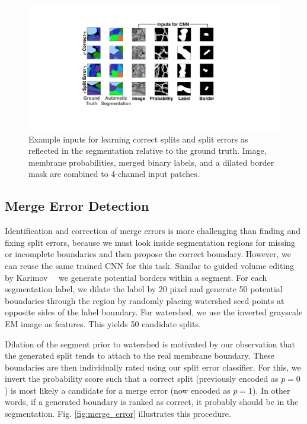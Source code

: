 \begin{figure}[h]
\begin{center}
  \includegraphics[width=\linewidth]{gfx/cnn_inputs.pdf}
\end{center}
   \caption{Example inputs for learning correct splits and split errors as reflected in the segmentation relative to the ground truth. Image, membrane probabilities, merged binary labels, and a dilated border mask are combined to 4-channel input patches.}
\label{fig:cnn_inputs}
\end{figure}


\subsection{Merge Error Detection}

Identification and correction of merge errors is more challenging than finding and fixing split errors, because we must look inside segmentation regions for missing or incomplete boundaries and then propose the correct boundary. However, we can reuse the same trained CNN for this task. Similar to guided volume editing by Karimov~\etal~\cite{karimov_guided_volume_editing} we generate potential borders within a segment. For each segmentation label, we dilate the label by 20 pixel and generate 50 potential boundaries through the region by randomly placing watershed seed points at opposite sides of the label boundary. For watershed, we use the inverted grayscale EM image as features. This yields 50 candidate splits.

Dilation of the segment prior to watershed is motivated by our observation that the generated split tends to attach to the real membrane boundary. These boundaries are then individually rated using our split error classifier. For this, we invert the probability score such that a correct split (previously encoded as $p=0$) is most likely a candidate for a merge error (now encoded as $p=1$). In other words, if a generated boundary is ranked as correct, it probably should be in the segmentation. Fig. \ref{fig:merge_error} illustrates this procedure.

